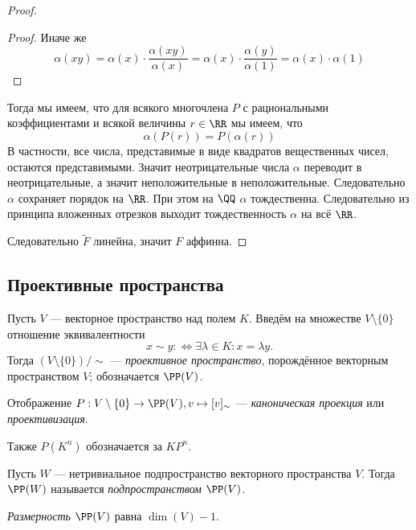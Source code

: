 \documentclass[12pt,a4paper]{article}
\begin{document}
\begin{proof}
\begin{proof}
            Иначе же
            \[
                \alpha(xy)
                = \alpha(x) \cdot \frac{\alpha(xy)}{\alpha(x)}
                = \alpha(x) \cdot \frac{\alpha(y)}{\alpha(1)}
                = \alpha(x) \cdot \alpha(1)
            \]
        \end{proof}

        Тогда мы имеем, что для всякого многочлена $P$ с рациональными коэффициентами и всякой величины $r \in \RR$ мы имеем, что
        \[\alpha(P(r)) = P(\alpha(r))\]
        В частности, все числа, представимые в виде квадратов вещественных чисел, остаются представимыми. Значит неотрицательные числа $\alpha$ переводит в неотрицательные, а значит неположительные в неположительные. Следовательно $\alpha$ сохраняет порядок на $\RR$. При этом на $\QQ$ $\alpha$ тождественна. Следовательно из принципа вложенных отрезков выходит тождественность $\alpha$ на всё $\RR$.

        Следовательно $\widetilde{F}$ линейна, значит $F$ аффинна.
    \end{proof}

    \subsection{Проективные пространства}

    \begin{definition}
        Пусть $V$ --- векторное пространство над полем $K$. Введём на множестве $V \setminus \{0\}$ отношение эквивалентности
        \[x \sim y :\Leftrightarrow \exists \lambda \in K: x = \lambda y.\]
        Тогда $(V \setminus \{0\}) / \sim$ --- \emph{проективное пространство}, порождённое векторным пространством $V$; обозначается $\PP(V)$.

        Отображение $P: V \setminus \{0\} \to \PP(V), v \mapsto [v]_{\sim}$ --- \emph{каноническая проекция} или \emph{проективизация}.

        Также $P(K^n)$ обозначается за $K P^n$.
    \end{definition}

    \begin{definition}
        Пусть $W$ --- нетривиальное подпространство векторного пространства $V$. Тогда $\PP(W)$ называется \emph{подпространством} $\PP(V)$.
    \end{definition}

    \begin{definition}
        \emph{Размерность} $\PP(V)$ равна $\dim(V) - 1$.
    \end{definition}
\end{document}
